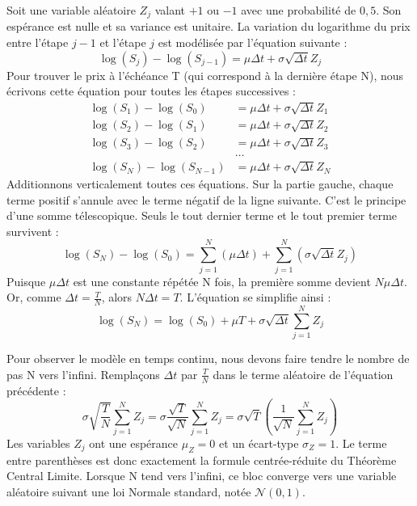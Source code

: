 Soit une variable aléatoire $Z_j$ valant $+1$ ou $-1$ avec une probabilité de $0,5$. Son espérance est nulle et sa variance est unitaire.
La variation du logarithme du prix entre l'étape $j-1$ et l'étape $j$ est modélisée par l'équation suivante :
\begin{equation}
    \label{eq:fsec3-log_step}
    \log(S_j) - \log(S_{j-1}) = \mu \Delta t + \sigma \sqrt{\Delta t} Z_j
\end{equation}
Pour trouver le prix à l'échéance T (qui correspond à la dernière étape N), nous écrivons cette équation pour toutes les étapes successives :
\begin{equation}
    \label{eq:fsec3-log_sum}
\begin{aligned}
    \log(S_1) - \log(S_0) &= \mu \Delta t + \sigma \sqrt{\Delta t} Z_1 \\
    \log(S_2) - \log(S_1) &= \mu \Delta t + \sigma \sqrt{\Delta t} Z_2 \\
    \log(S_3) - \log(S_2) &= \mu \Delta t + \sigma \sqrt{\Delta t} Z_3 \\
    &\dots \\
    \log(S_N) - \log(S_{N-1}) &= \mu \Delta t + \sigma \sqrt{\Delta t} Z_N
\end{aligned}
\end{equation}
Additionnons verticalement toutes ces équations. Sur la partie gauche, chaque terme positif s'annule avec le terme négatif de la ligne suivante. C'est le principe d'une somme télescopique. Seuls le tout dernier terme et le tout premier terme survivent :
\begin{equation}
    \label{eq:fsec3-log_telescopique}
    \log(S_N) - \log(S_0) = \sum_{j=1}^{N} \left( \mu \Delta t \right) + \sum_{j=1}^{N} \left( \sigma \sqrt{\Delta t} Z_j \right)
\end{equation}
Puisque $\mu \Delta t$ est une constante répétée N fois, la première somme devient $N \mu \Delta t$. Or, comme $\Delta t = \frac{T}{N}$, alors $N \Delta t = T$. L'équation se simplifie ainsi :
\begin{equation}
    \label{eq:fsec3-log_sn}
    \log(S_N) = \log(S_0) + \mu T + \sigma \sqrt{\Delta t} \sum_{j=1}^{N} Z_j
\end{equation}

Pour observer le modèle en temps continu, nous devons faire tendre le nombre de pas N vers l'infini. 
Remplaçons $\Delta t$ par $\frac{T}{N}$ dans le terme aléatoire de l'équation précédente :
\begin{equation}
    \label{eq:fsec3-log_limit}
    \sigma \sqrt{\frac{T}{N}} \sum_{j=1}^{N} Z_j = \sigma \frac{\sqrt{T}}{\sqrt{N}} \sum_{j=1}^{N} Z_j = \sigma \sqrt{T} \left( \frac{1}{\sqrt{N}} \sum_{j=1}^{N} Z_j \right)
\end{equation}
Les variables $Z_j$ ont une espérance $\mu_Z = 0$ et un écart-type $\sigma_Z = 1$. Le terme entre parenthèses est donc exactement la formule centrée-réduite du Théorème Central Limite. Lorsque N tend vers l'infini, ce bloc converge vers une variable aléatoire suivant une loi Normale standard, notée $\mathcal{N}(0,1)$.

